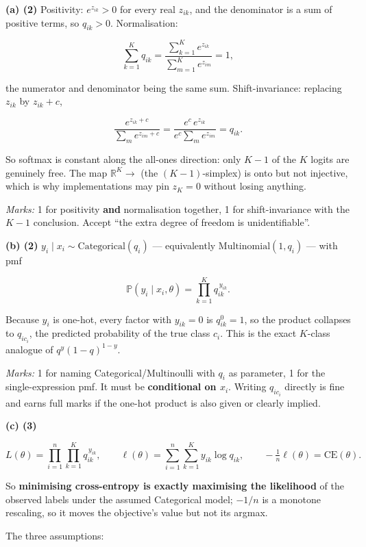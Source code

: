 \documentclass[
  11pt,
  a4paper,
]{article}
\newcommand{\PP}{\mathbb{P}}
\begin{document}
\textbf{(a) (2)} Positivity: \(e^{z_{ik}}>0\) for every real \(z_{ik}\),
and the denominator is a sum of positive terms, so \(q_{ik}>0\).
Normalisation:

\[
\sum_{k=1}^{K} q_{ik}
= \frac{\sum_{k=1}^{K} e^{z_{ik}}}{\sum_{m=1}^{K} e^{z_{im}}} = 1 ,
\]

the numerator and denominator being the same sum. Shift-invariance:
replacing \(z_{ik}\) by \(z_{ik}+c\),

\[
\frac{e^{z_{ik}+c}}{\sum_m e^{z_{im}+c}}
= \frac{e^{c}\,e^{z_{ik}}}{e^{c}\sum_m e^{z_{im}}}
= q_{ik} .
\]

So softmax is constant along the all-ones direction: only
\textbf{\(K-1\)} of the \(K\) logits are genuinely free. The map
\(\mathbb{R}^K \to\) (the \((K-1)\)-simplex) is onto but not injective,
which is why implementations may pin \(z_K = 0\) without losing
anything.

\emph{Marks:} 1 for positivity \textbf{and} normalisation together, 1
for shift-invariance with the \(K-1\) conclusion. Accept ``the extra
degree of freedom is unidentifiable''.

\textbf{(b) (2)} \(y_i \mid x_i \sim \mathrm{Categorical}(q_i)\) ---
equivalently \(\mathrm{Multinomial}(1, q_i)\) --- with pmf

\[
\PP(y_i \mid x_i, \theta) = \prod_{k=1}^{K} q_{ik}^{\,y_{ik}} .
\]

Because \(y_i\) is one-hot, every factor with \(y_{ik}=0\) is
\(q_{ik}^{0}=1\), so the product collapses to \(q_{i c_i}\), the
predicted probability of the true class \(c_i\). This is the exact
\(K\)-class analogue of \(q^{y}(1-q)^{1-y}\).

\emph{Marks:} 1 for naming Categorical/Multinoulli with \(q_i\) as
parameter, 1 for the single-expression pmf. It must be
\textbf{conditional on \(x_i\)}. Writing \(q_{i c_i}\) directly is fine
and earns full marks if the one-hot product is also given or clearly
implied.

\textbf{(c) (3)}

\[
L(\theta) = \prod_{i=1}^{n}\prod_{k=1}^{K} q_{ik}^{\,y_{ik}},
\qquad
\ell(\theta) = \sum_{i=1}^{n}\sum_{k=1}^{K} y_{ik}\log q_{ik},
\qquad
-\tfrac{1}{n}\ell(\theta) = \mathrm{CE}(\theta).
\]

So \textbf{minimising cross-entropy is exactly maximising the
likelihood} of the observed labels under the assumed Categorical model;
\(-1/n\) is a monotone rescaling, so it moves the objective's value but
not its argmax.

The three assumptions:
\end{document}

